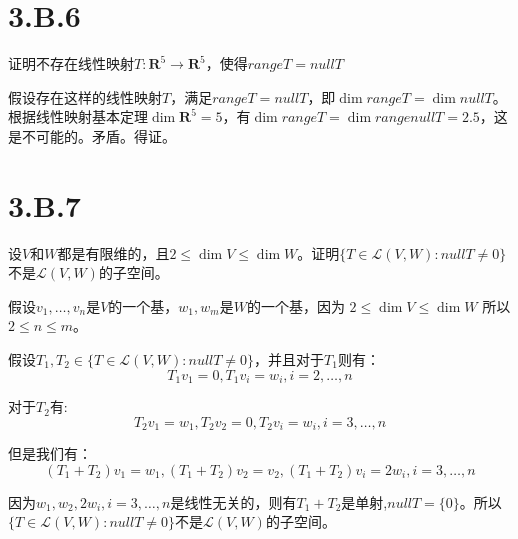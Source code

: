 \documentclass[10pt,a4paper,UTF8]{article}
\begin{document}
\section{3.B.6}
\label{sec:orgbd4d91b}


\begin{problem}
证明不存在线性映射\(T: \mathbf{R}^{5} \rightarrow \mathbf{R}^{5}\)，使得\(range T = nullT\)
\end{problem}

\begin{answer}
假设存在这样的线性映射\(T\)，满足\(range T = nullT\)，即\(\dim range T = \dim null T\)。根据线性映射基本定理\(\dim \mathbf{R}^{5} =5\)，有\(\dim range T = \dim range null T = 2.5\)，这是不可能的。矛盾。得证。
\end{answer}

\section{3.B.7}
\label{sec:org4d7cf5c}


\begin{problem}
设\(V\)和\(W\)都是有限维的，且\(2\leq \dim V \leq \dim W\)。证明\(\{T\in \mathcal{L}(V,W): nullT \neq {0}\}\) 不是\(\mathcal{L}(V,W)\)的子空间。
\end{problem}

\begin{answer}
假设\(v_{1},\ldots ,v_{n}\)是\(V\)的一个基，\(w_{1},w_{m}\)是\(W\)的一个基，因为 \(2\leq \dim V \leq \dim W\) 所以\(2\leq n \leq m\)。

假设\(T_{1},T_{2}\in \{T\in \mathcal{L}(V,W): nullT \neq {0}\}\)，并且对于\(T_{1}\)则有：
\begin{equation}
\label{eq:3}
T_{1}v_{1} = 0, T_{1}v_{i} = w_{i}, i = 2,\ldots ,n
\end{equation}

对于\(T_{2}\)有:
\begin{equation}
\label{eq:4}
T_{2}v_{1} = w_{1}, T_{2}v_{2} = 0, T_{2}v_{i}= w_{i}, i = 3,\ldots ,n
\end{equation}

但是我们有：
\begin{equation}
\label{eq:5}
(T_{1} + T_{2}) v_{1} = w_{1}, (T_{1} + T_{2}) v_{2} = v_{2}, (T_{1} + T_{2})v_{i} = 2w_{i}, i = 3,\ldots ,n
\end{equation}

因为\(w_{1},w_{2},2w_{i},i=3,\ldots ,n\)是线性无关的，则有\(T_{1}+T_{2}\)是单射,\(nullT = \{0\}\)。所以\(\{T\in \mathcal{L}(V,W): nullT \neq {0}\}\)不是\(\mathcal{L}(V,W)\)的子空间。
\end{answer}
\end{document}
